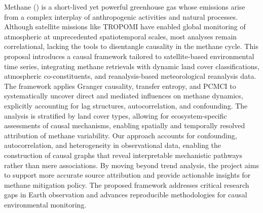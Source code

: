 \acresetall

Methane () is a short-lived yet powerful greenhouse gas whose emissions arise from a complex interplay of anthropogenic activities and natural processes. Although satellite missions like TROPOMI have enabled global monitoring of atmospheric  at unprecedented spatiotemporal scales, most analyses remain correlational, lacking the tools to disentangle causality in the methane cycle. This proposal introduces a causal framework tailored to satellite-based environmental time series, integrating methane retrievals with dynamic land cover classifications, atmospheric co-constituents, and reanalysis-based meteorological reanalysis data. The framework applies Granger causality, transfer entropy, and PCMCI to systematically uncover direct and mediated influences on methane dynamics, explicitly accounting for lag structures, autocorrelation, and confounding. The analysis is stratified by land cover types, allowing for ecosystem-specific assessments of causal mechanisms, enabling spatially and temporally resolved attribution of methane variability. Our approach accounts for confounding, autocorrelation, and heterogeneity in observational data, enabling the construction of causal graphs that reveal interpretable mechanistic pathways rather than mere associations. By moving beyond trend analysis, the project aims to support more accurate source attribution and provide actionable insights for methane mitigation policy. The proposed framework addresses critical research gaps in Earth observation and advances reproducible methodologies for causal environmental monitoring.


